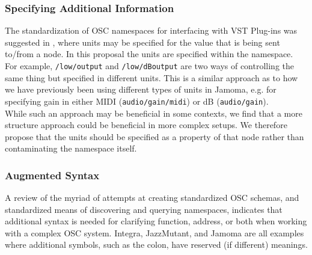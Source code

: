 \documentclass{NIME-alternate}
\begin{document}
\subsubsection{Specifying Additional Information}
The standardization of OSC namespaces for interfacing with VST Plug-ins was suggested in \cite{Zbyszynski:2005}, where units may be specified for the value that is being sent to/from a node.  In this proposal the units are specified within the namespace.  For example, \texttt{/low/output} and \texttt{/low/dBoutput} are two ways of controlling the same thing but specified in different units. This is a similar approach as to how we have previously been using different types of units in Jamoma, e.g. for specifying gain in either MIDI (\texttt{audio/gain/midi}) or dB (\texttt{audio/gain}).\\ 
While such an approach may be beneficial in some contexts, we find that a more structure approach could be beneficial in more complex setups. We therefore propose that the units should be specified as a property of that node rather than contaminating the namespace itself.

\subsubsection{Augmented Syntax}

A review of the myriad of attempts at creating standardized OSC schemas, and standardized means of discovering and querying namespaces, indicates that additional syntax is needed for clarifying function, address, or both when working with a complex OSC system.  Integra, JazzMutant, and Jamoma are all examples where additional symbols, such as the colon, have reserved (if different) meanings.

%
%
%
\end{document}

